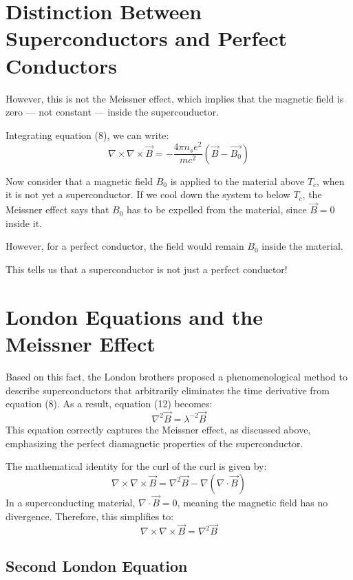 \documentclass{article}
\begin{document}
\section{Distinction Between Superconductors and Perfect Conductors}

However, this is not the Meissner effect, which implies that the magnetic field is zero — not constant — inside the superconductor.

Integrating equation (8), we can write:
\[
\nabla \times \nabla \times \vec{B} = - \frac{4 \pi n_s e^2}{mc^2} (\vec{B} - \vec{B_0}) \tag{12}
\]

Now consider that a magnetic field \(B_0\) is applied to the material above \(T_c\), when it is not yet a superconductor. If we cool down the system to below \(T_c\), the Meissner effect says that \(B_0\) has to be expelled from the material, since \(\vec{B} = 0\) inside it. 

However, for a perfect conductor, the field would remain \(B_0\) inside the material.

This tells us that a superconductor is not just a perfect conductor!

\section{London Equations and the Meissner Effect}

Based on this fact, the London brothers proposed a phenomenological method to describe superconductors that arbitrarily eliminates the time derivative from equation (8). As a result, equation (12) becomes:
\[
\nabla^2 \vec{B} = \lambda^{-2} \vec{B} \tag{13}
\]
This equation correctly captures the Meissner effect, as discussed above, emphasizing the perfect diamagnetic properties of the superconductor.

\begin{theorem}
    The mathematical identity for the curl of the curl is given by:
\[
\nabla \times \nabla \times \vec{B} = \nabla^2 \vec{B} - \nabla (\nabla \cdot \vec{B})
\]
In a superconducting material, \(\nabla \cdot \vec{B} = 0\), meaning the magnetic field has no divergence. Therefore, this simplifies to:
\[
\nabla \times \nabla \times \vec{B} = \nabla^2 \vec{B}
\]

\end{theorem}

\subsection{Second London Equation}
\end{document}
